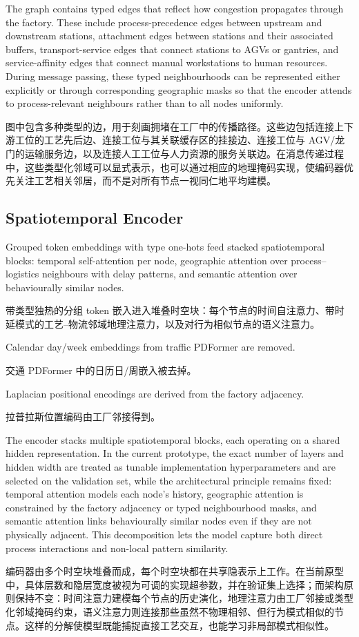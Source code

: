 \documentclass[12pt,a4paper,oneside,scheme=plain]{ctexrep}
\newcommand{\bip}[2]{%
  \par #1\par
  \nobreak\vspace{0.12em}%
  {\small\color{black!62}#2}\par
  \vspace{0.62em}%
}
\begin{document}
\bip
{The graph contains typed edges that reflect how congestion propagates through the factory. These include process-precedence edges between upstream and downstream stations, attachment edges between stations and their associated buffers, transport-service edges that connect stations to AGVs or gantries, and service-affinity edges that connect manual workstations to human resources. During message passing, these typed neighbourhoods can be represented either explicitly or through corresponding geographic masks so that the encoder attends to process-relevant neighbours rather than to all nodes uniformly.}
{图中包含多种类型的边，用于刻画拥堵在工厂中的传播路径。这些边包括连接上下游工位的工艺先后边、连接工位与其关联缓存区的挂接边、连接工位与 AGV/龙门的运输服务边，以及连接人工工位与人力资源的服务关联边。在消息传递过程中，这些类型化邻域可以显式表示，也可以通过相应的地理掩码实现，使编码器优先关注工艺相关邻居，而不是对所有节点一视同仁地平均建模。}

\subsection[Spatiotemporal Encoder / 时空编码器]{Spatiotemporal Encoder}
\label{sec:encoder}

\bip
{Grouped token embeddings with type one-hots feed stacked spatiotemporal blocks: temporal self-attention per node, geographic attention over process--logistics neighbours with delay patterns, and semantic attention over behaviourally similar nodes.}
{带类型独热的分组 token 嵌入进入堆叠时空块：每个节点的时间自注意力、带时延模式的工艺--物流邻域地理注意力，以及对行为相似节点的语义注意力。}

\bip
{Calendar day/week embeddings from traffic PDFormer are removed.}
{交通 PDFormer 中的日历日/周嵌入被去掉。}

\bip
{Laplacian positional encodings are derived from the factory adjacency.}
{拉普拉斯位置编码由工厂邻接得到。}


\bip
{The encoder stacks multiple spatiotemporal blocks, each operating on a shared hidden representation. In the current prototype, the exact number of layers and hidden width are treated as tunable implementation hyperparameters and are selected on the validation set, while the architectural principle remains fixed: temporal attention models each node's history, geographic attention is constrained by the factory adjacency or typed neighbourhood masks, and semantic attention links behaviourally similar nodes even if they are not physically adjacent. This decomposition lets the model capture both direct process interactions and non-local pattern similarity.}
{编码器由多个时空块堆叠而成，每个时空块都在共享隐表示上工作。在当前原型中，具体层数和隐层宽度被视为可调的实现超参数，并在验证集上选择；而架构原则保持不变：时间注意力建模每个节点的历史演化，地理注意力由工厂邻接或类型化邻域掩码约束，语义注意力则连接那些虽然不物理相邻、但行为模式相似的节点。这样的分解使模型既能捕捉直接工艺交互，也能学习非局部模式相似性。}
\end{document}

